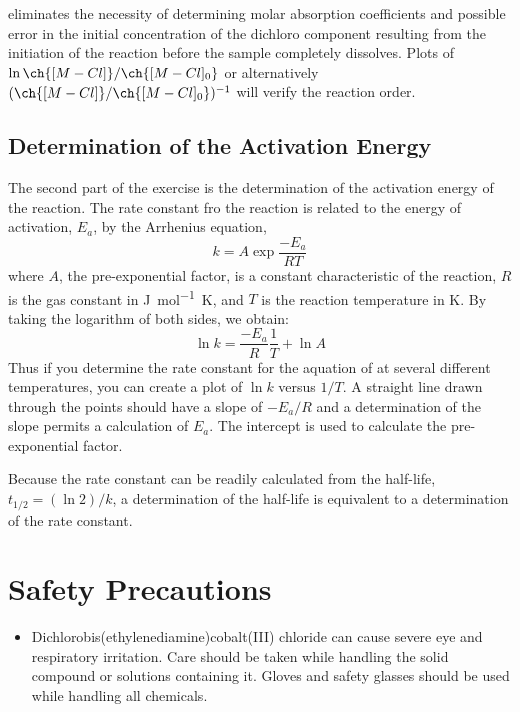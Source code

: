  eliminates the necessity of determining molar absorption coefficients and possible error in the initial concentration of the dichloro component resulting from the initiation of the reaction before the sample completely dissolves. 
Plots of \(\ln{\ch{[M-Cl]}/\ch{[M-Cl]_0}}\) or alternatively \(({\ch{[M-Cl]}/\ch{[M-Cl]_0}})^{-1}\)  will verify the reaction order. 

\subsection{Determination of the Activation Energy}
\label{subs:determination_of_activation_energy}

The second part of the exercise is the determination of the activation energy of the reaction. 
The rate constant fro the reaction is related to the energy of activation, \(E_a\), by the Arrhenius equation, 
\begin{equation}
	k = A \exp{\frac{-E_a}{RT}}
	\label{eq:arrhenius}
\end{equation}
where \(A\), the pre-exponential factor, is a constant characteristic of the reaction, \(R\) is the gas constant in \unit{\joule\per\mole\kelvin}, and \(T\) is the reaction temperature in \unit{\kelvin}. 
By taking the logarithm of both sides, we obtain:
\begin{equation}
	\ln{k} = \frac{-E_a}{R} \frac{1}{T} + \ln{A}
	\label{eq:arrhenius_linear}
\end{equation}
Thus if you determine the rate constant for the aquation of  at several different temperatures, you can create a plot of \(\ln{k}\) versus \(1/T\). 
A straight line drawn through the points should have a slope of \(-E_a/R\) and a determination of the slope permits a calculation of \(E_a\). 
The intercept is used to calculate the pre-exponential factor. 

Because the rate constant can be readily calculated from the half-life, \(t_{1/2} = (\ln{2}) / k\), a determination of the half-life is equivalent to a determination of the rate constant. 

\section{Safety Precautions}
\label{sec:safety}

\begin{itemize}
	\item Dichlorobis(ethylenediamine)cobalt(III) chloride can cause severe eye and respiratory irritation. 
	Care should be taken while handling the solid compound or solutions containing it. 
	Gloves and safety glasses should be used while handling all chemicals. 
\end{itemize}

